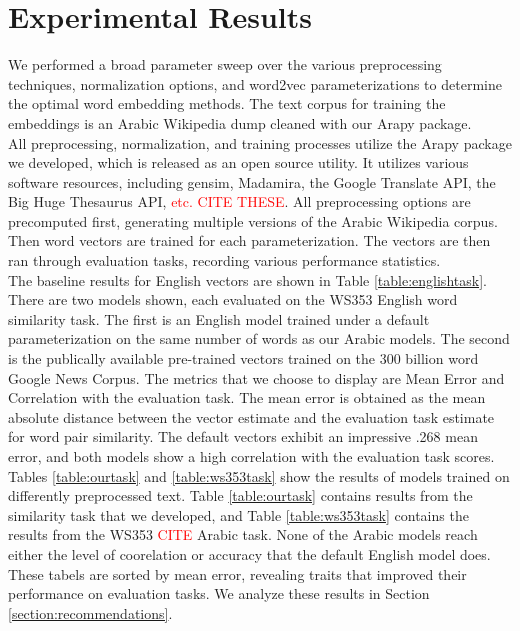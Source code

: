 
\section{Experimental Results}
\label{sec:experiments}

We performed a broad parameter sweep over the various preprocessing techniques, normalization options, and word2vec parameterizations to determine the optimal word embedding methods. The text corpus for training the embeddings is an Arabic Wikipedia dump cleaned with our Arapy package.
\\
All preprocessing, normalization, and training processes utilize the Arapy package we developed, which is released as an open source utility. It utilizes various software resources, including gensim, Madamira, the Google Translate API, the Big Huge Thesaurus API, \textcolor{red}{etc. CITE THESE}. All preprocessing options are precomputed first, generating multiple versions of the Arabic Wikipedia corpus. Then word vectors are trained for each parameterization. The vectors are then ran through evaluation tasks, recording various performance statistics.
\\
The baseline results for English vectors are shown in Table \ref{table:englishtask}. There are two models shown, each evaluated on the WS353 English word similarity task. The first is an English model trained under a default parameterization on the same number of words as our Arabic models. The second is the publically available pre-trained vectors trained on the 300 billion word Google News Corpus. The metrics that we choose to display are Mean Error and Correlation with the evaluation task. The mean error is obtained as the mean absolute distance between the vector estimate and the evaluation task estimate for word pair similarity. The default vectors exhibit an impressive .268 mean error, and both models show a high correlation with the evaluation task scores.
\\
Tables \ref{table:ourtask} and \ref{table:ws353task} show the results of models trained on differently preprocessed text. Table \ref{table:ourtask} contains results from the similarity task that we developed, and Table \ref{table:ws353task} contains the results from the WS353 \textcolor{red}{CITE} Arabic task. None of the Arabic models reach either the level of coorelation or accuracy that the default English model does. These tabels are sorted by mean error, revealing traits that improved their performance on evaluation tasks. We analyze these results in Section \ref{section:recommendations}.

